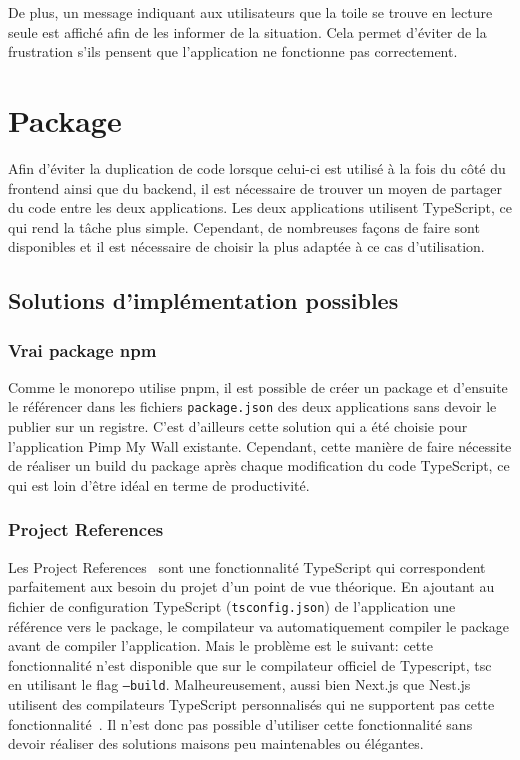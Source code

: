 De plus, un message indiquant aux utilisateurs que la toile se trouve en lecture seule est affiché afin de les informer de la situation. Cela permet d'éviter de la frustration s'ils pensent que l'application ne fonctionne pas correctement.

\section{Package}

Afin d'éviter la duplication de code lorsque celui-ci est utilisé à la fois du côté du frontend ainsi que du backend, il est nécessaire de trouver un moyen de partager du code entre les deux applications. Les deux applications utilisent TypeScript, ce qui rend la tâche plus simple. Cependant, de nombreuses façons de faire sont disponibles et il est nécessaire de choisir la plus adaptée à ce cas d'utilisation.

\subsection{Solutions d'implémentation possibles}

\subsubsection{Vrai package npm}

Comme le monorepo utilise \gls{pnpm}, il est possible de créer un package et d'ensuite le référencer dans les fichiers \texttt{package.json} des deux applications sans devoir le publier sur un registre. C'est d'ailleurs cette solution qui a été choisie pour l'application Pimp My Wall existante. Cependant, cette manière de faire nécessite de réaliser un build du package après chaque modification du code TypeScript, ce qui est loin d'être idéal en terme de productivité.

\subsubsection{Project References}

Les Project References~\cite{project-references} sont une fonctionnalité TypeScript qui correspondent parfaitement aux besoin du projet d'un point de vue théorique. En ajoutant au fichier de configuration TypeScript (\texttt{tsconfig.json}) de l'application une référence vers le package, le compilateur va automatiquement compiler le package avant de compiler l'application. Mais le problème est le suivant: cette fonctionnalité n'est disponible que sur le compilateur officiel de Typescript, tsc~\cite{tsc} en utilisant le flag \texttt{---build}. Malheureusement, aussi bien Next.js que Nest.js utilisent des compilateurs TypeScript personnalisés qui ne supportent pas cette fonctionnalité~\cite{nest-tsc-build-option}. Il n'est donc pas possible d'utiliser cette fonctionnalité sans devoir réaliser des solutions maisons peu maintenables ou élégantes.

